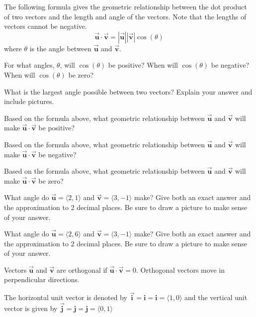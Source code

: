 \begin{info} The following formula gives the geometric relationship between the dot product of two vectors and the length and angle of the vectors. Note that the lengths of vectors cannot be negative. $$\vec{\textbf{u}} \cdot \vec{\textbf{v}}= |\vec{\textbf{u}}| | \vec{\textbf{v}}| \cos(\theta)$$
where $\theta$ is the angle between $\vec{\textbf{u}}$ and $\vec{\textbf{v}}$.
\end{info}

\bq \be
\item For what angles, $\theta$, will $\cos(\theta)$ be positive? When will $\cos(\theta)$ be negative? When will $\cos(\theta)$ be zero?
\item What is the largest angle possible between two vectors? Explain your answer and include pictures.
\item Based on the formula above, what geometric relationship between $\vec{\textbf{u}}$ and $\vec{\textbf{v}}$ will make $\vec{\textbf{u}} \cdot \vec{\textbf{v}}$ be positive?
\item Based on the formula above, what geometric relationship between $\vec{\textbf{u}}$ and $\vec{\textbf{v}}$ will make $\vec{\textbf{u}} \cdot \vec{\textbf{v}}$ be negative?
\item Based on the formula above, what geometric relationship between $\vec{\textbf{u}}$ and $\vec{\textbf{v}}$ will make $\vec{\textbf{u}} \cdot \vec{\textbf{v}}$ be zero?
\ee \eq

\bq What angle do $\vec{\textbf{u}}=\langle 2,1\rangle$ and $\vec{\textbf{v}}=\langle 3,-1\rangle$ make? Give both an exact answer and the approximation to 2 decimal places. Be sure to draw a picture to make sense of your answer.
\eq

\bq What angle do $\vec{\textbf{u}}=\langle 2,6\rangle$ and $\vec{\textbf{v}}=\langle 3,-1\rangle$ make? Give both an exact answer and the approximation to 2 decimal places. Be sure to draw a picture to make sense of your answer.
\eq
\begin{info} Vectors $\vec{\textbf{u}}$ and $\vec{\textbf{v}}$ are orthogonal if $\vec{\textbf{u}} \cdot \vec{\textbf{v}}= 0$. Orthogonal vectors move in perpendicular directions.

The horizontal unit vector is denoted by $\vec{\textbf{i}}= \hat{\textbf{i}}= \textbf{i}= \langle 1,0\rangle$ and the vertical unit vector is given by $\vec{\textbf{j}}= \hat{\textbf{j}}= \textbf{j}=\langle 0,1\rangle$
\end{info}

